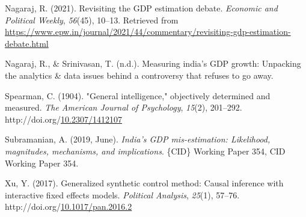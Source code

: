 \documentclass[12pt,nobind, a4paper]{reedthesis}
\newlength{\cslhangindent}
\newenvironment{CSLReferences}[2] %
{%
	\setlength{\parindent}{0pt}
	\ifodd #1 \everypar{\setlength{\hangindent}{\cslhangindent}}\ignorespaces\fi
	\ifnum #2 > 0
	\setlength{\parskip}{#2\baselineskip}
	\fi
}%
{}
\begin{document}
\begin{CSLReferences}{1}{0}
 \leavevmode{}%
 Nagaraj, R. (2021). Revisiting the {GDP} estimation debate. \emph{Economic and Political Weekly}, \emph{56}(45), 10--13. Retrieved from \url{https://www.epw.in/journal/2021/44/commentary/revisiting-gdp-estimation-debate.html}

 \leavevmode{}%
 Nagaraj, R., \& Srinivasan, T. (n.d.). Measuring india's {GDP} growth: Unpacking the analytics \& data issues behind a controversy that refuses to go away.

 \leavevmode{}%
 Spearman, C. (1904). "General intelligence," objectively determined and measured. \emph{The American Journal of Psychology}, \emph{15}(2), 201--292. http://doi.org/\href{https://doi.org/10.2307/1412107}{10.2307/1412107}

 \leavevmode{}%
 Subramanian, A. (2019, June). \emph{India's {GDP} mis-estimation: Likelihood, magnitudes, mechanisms, and implications}. \{CID\} Working Paper 354, {CID} Working Paper 354.

 \leavevmode{}%
 Xu, Y. (2017). Generalized synthetic control method: Causal inference with interactive fixed effects models. \emph{Political Analysis}, \emph{25}(1), 57--76. http://doi.org/\href{https://doi.org/10.1017/pan.2016.2}{10.1017/pan.2016.2}

 \end{CSLReferences}
	
	
\end{document}
